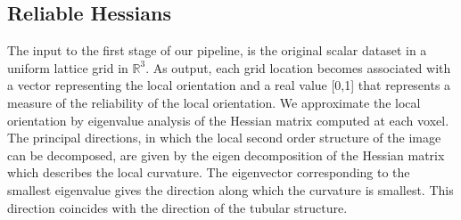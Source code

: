 

\subsection {Reliable Hessians}
\label{subsec:rh}

The input to the first stage of our pipeline, is the original scalar dataset in a uniform lattice grid in $\mathbb{R}^3$. As output, each grid location becomes associated with a vector representing the local orientation and a real value [0,1] that represents a measure of the reliability of the local orientation. We approximate the local orientation by eigenvalue analysis of the Hessian matrix computed at each voxel. The principal directions, in which the local second order structure of the image can be decomposed, are given by the eigen decomposition of the Hessian matrix which describes the local curvature.
The eigenvector corresponding to the smallest eigenvalue gives the direction along which the curvature is smallest. This direction coincides with the direction of the tubular structure.

